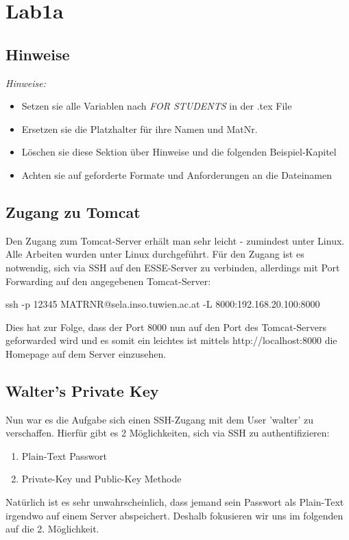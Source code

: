 \section{Lab1a}

\subsection{Hinweise}
\emph{Hinweise:}
\begin{itemize}
    \item Setzen sie alle Variablen nach \emph{FOR STUDENTS} in der .tex File
    \item Ersetzen sie die Platzhalter für ihre Namen und MatNr.
    \item Löschen sie diese Sektion über Hinweise und die folgenden Beispiel-Kapitel
    \item Achten sie auf geforderte Formate und Anforderungen an die Dateinamen
\end{itemize}

\subsection{Zugang zu Tomcat}
Den Zugang zum Tomcat-Server erhält man sehr leicht - zumindest unter Linux. Alle Arbeiten wurden unter Linux
durchgeführt. Für den Zugang ist es notwendig, sich via SSH auf den ESSE-Server zu verbinden, allerdings mit Port Forwarding
auf den angegebenen Tomcat-Server:

ssh -p 12345 MATRNR@sela.inso.tuwien.ac.at -L 8000:192.168.20.100:8000

Dies hat zur Folge, dass der Port 8000 nun auf den Port des Tomcat-Servers geforwarded wird und es somit ein leichtes
ist mittels http://localhost:8000 die Homepage auf dem Server einzusehen.

\subsection{Walter's Private Key}
Nun war es die Aufgabe sich einen SSH-Zugang mit dem User 'walter' zu verschaffen. Hierfür gibt es 2 Möglichkeiten, sich
via SSH zu authentifizieren:
\begin{enumerate}
\item Plain-Text Passwort
\item Private-Key und Public-Key Methode
\end{enumerate}

Natürlich ist es sehr unwahrscheinlich, dass jemand sein Passwort als Plain-Text irgendwo auf einem Server abspeichert. Deshalb
fokusieren wir uns im folgenden auf die 2. Möglichkeit.

